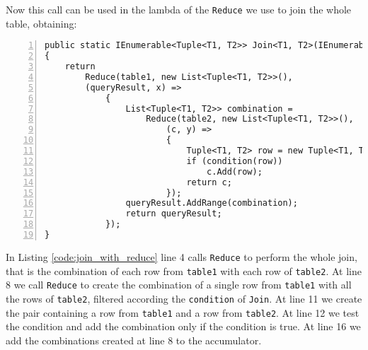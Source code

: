 \noindent
Now this call can be used in the lambda of the \texttt{Reduce} we use to join the whole table, obtaining:

\begin{lstlisting}[numbers = left, caption = Join with Reduce, label = code:join_with_reduce]
public static IEnumerable<Tuple<T1, T2>> Join<T1, T2>(IEnumerable<T1> table1, IEnumerable<T2> table2, Func<Tuple<T1, T2>, bool> condition)
{
	return
		Reduce(table1, new List<Tuple<T1, T2>>(),
		(queryResult, x) =>
			{
				List<Tuple<T1, T2>> combination =
					Reduce(table2, new List<Tuple<T1, T2>>(),
						(c, y) =>
						{
							Tuple<T1, T2> row = new Tuple<T1, T2>(x, y);
							if (condition(row))
								c.Add(row);
							return c;
						});
				queryResult.AddRange(combination);
				return queryResult;
			});
}
\end{lstlisting}

\noindent
In Listing \ref{code:join_with_reduce} line 4 calls \texttt{Reduce} to perform the whole join, that is the combination of each row from \texttt{table1} with each row of \texttt{table2}. At line 8 we call \texttt{Reduce} to create the combination of a single row from \texttt{table1} with all the rows of \texttt{table2}, filtered according the \texttt{condition} of \texttt{Join}. At line 11 we create the pair containing a row from \texttt{table1} and a row from \texttt{table2}. At line 12 we test the condition and add the combination only if the condition is true. At line 16 we add the combinations created at line 8 to the accumulator.